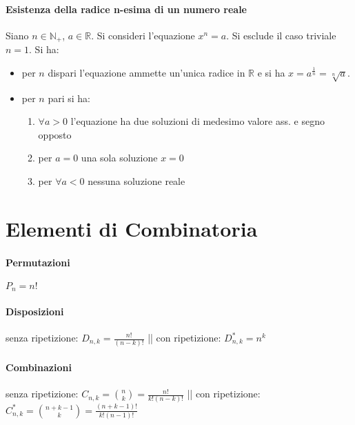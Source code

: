 \documentclass[10pt, oneside]{book}
\theoremstyle{plain}
\begin{document}
\subsubsection{Esistenza della radice n-esima di un numero reale}
    Siano $n \in \mathbb{N}_+$, $a \in \mathbb{R}$. Si consideri l'equazione $x^n = a$. Si esclude il caso triviale $n = 1$. Si ha:
    \begin{itemize}
        \item per $n$ dispari l'equazione ammette un'unica radice in $\mathbb{R}$ e si ha $x = a^{\frac{1}{n}} = \sqrt[n]{a}$.
        \item per $n$ pari si ha:
        \begin{enumerate}
            \item $\forall a > 0$ l'equazione ha due soluzioni di medesimo valore ass. e segno opposto
            \item per $a = 0$ una sola soluzione $x = 0$
            \item per $\forall a < 0$ nessuna soluzione reale
        \end{enumerate}
    \end{itemize}

\chapter{Elementi di Combinatoria}
\subsubsection{Permutazioni} $P_n = n!$
\subsubsection{Disposizioni} senza ripetizione: $D_{n, k} = \frac{n!}{(n-k)!}$ || con ripetizione: $D_{n, k}^* = n^k$
\subsubsection{Combinazioni} senza ripetizione: $C_{n, k} = \binom{n}{k} = \frac{n!}{k! (n-k)!}$ || con ripetizione: $C_{n, k}^* = \binom{n + k - 1}{k} = \frac{(n+k-1)!}{k! (n-1)!}$
\end{document}

